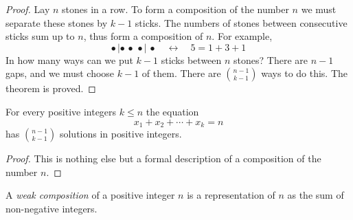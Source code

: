 \begin{page}
\setcounter{section}{3}
\setcounter{subsection}{5}
\setcounter{dfn}{10}
\label{portion:111}

\begin{proof}
Lay $n$ stones in a row.
To form a composition of the number $n$ we must separate these stones by $k-1$ sticks.
The numbers of stones between consecutive sticks sum up to $n$, thus form a composition of $n$.
For example,
\[
\bullet\, | \bullet\, \bullet\, \bullet |\, \bullet \quad \longleftrightarrow \quad 5 = 1+3+1
\]
In how many ways can we put $k-1$ sticks between $n$ stones?
There are $n-1$ gaps, and we must choose $k-1$ of them.
There are $\binom{n-1}{k-1}$ ways to do this. The theorem is proved.
\end{proof}


\end{page}

\begin{page}
\setcounter{section}{3}
\setcounter{subsection}{5}
\setcounter{dfn}{11}
\label{portion:113}

\begin{cor}
For every positive integers $k \le n$ the equation
\[
x_1 + x_2 + \cdots + x_k = n
\]
has $\binom{n-1}{k-1}$ solutions in positive integers.
\end{cor}

\end{page}

\begin{page}
\setcounter{section}{3}
\setcounter{subsection}{5}
\setcounter{dfn}{11}
\label{portion:114}

\begin{proof}
This is nothing else but a formal description of a composition of the number $n$.
\end{proof}


\end{page}

\begin{page}
\setcounter{section}{3}
\setcounter{subsection}{5}
\setcounter{dfn}{12}
\label{portion:116}

\begin{dfn}
A \emph{weak composition} of a positive integer $n$ is a representation of $n$ as the sum of non-negative integers.
\end{dfn}

\end{page}

